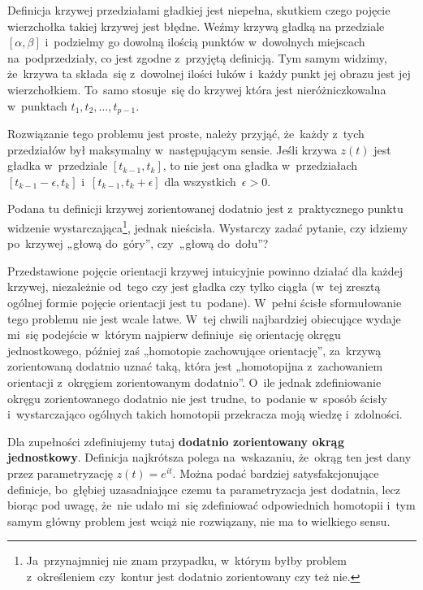 \documentclass[a4paper,11pt]{article}
\begin{document}
\vspace{\spaceFour}



\start {} Definicja krzywej przedziałami gładkiej jest
niepełna, skutkiem czego pojęcie wierzchołka takiej krzywej jest
błędne. Weźmy krzywą gładką na przedziale $[ \alpha, \beta ]$
i~podzielmy go dowolną ilością punktów w~dowolnych miejscach
na~podprzedziały, co jest zgodne z~przyjętą definicją. Tym samym
widzimy, że~krzywa ta składa~się z~dowolnej ilości łuków i~każdy punkt
jej obrazu jest jej wierzchołkiem. To~samo stosuje~się do krzywej
która jest nieróżniczkowalna w~punktach
$t_{ 1 }, t_{ 2 }, \ldots, t_{ p - 1 }$.

Rozwiązanie tego problemu jest proste, należy przyjąć, że~każdy z~tych
przedziałów był maksymalny w~następującym sensie. Jeśli krzywa
$z( t )$ jest gładka w~przedziale $[ t_{ k - 1 }, t_{ k } ]$, to nie
jest ona gładka w~przedziałach $[ t_{ k - 1 } - \epsilon, t_{ k } ]$
i~$[ t_{ k - 1 }, t_{ k } + \epsilon ]$ dla wszystkich~$\epsilon > 0$.

\vspace{\spaceFour}



\start {} Podana tu definicji krzywej zorientowanej dodatnio
jest z~praktycznego punktu widzenie
wystarczająca\footnote{Ja~przynajmniej nie znam przypadku, w~którym
  byłby problem z~określeniem czy~kontur jest dodatnio zorientowany
  czy też nie.}, jednak nieścisła. Wystarczy zadać pytanie, czy
idziemy po~krzywej „głową do~góry”, czy~„głową do~dołu”?

Przedstawione pojęcie orientacji krzywej intuicyjnie powinno działać
dla każdej krzywej, niezależnie od~tego czy jest gładka czy tylko
ciągła (w~tej zresztą ogólnej formie pojęcie orientacji jest
tu~podane). W~pełni ścisłe sformułowanie tego problemu nie jest wcale
łatwe. W~tej chwili najbardziej obiecujące wydaje mi~się podejście
w~którym najpierw definiuje~się orientację okręgu jednostkowego,
później zaś „homotopie zachowujące orientację”, za~krzywą
zorientowaną dodatnio uznać taką, która jest „homotopijna
z~zachowaniem orientacji z~okręgiem zorientowanym dodatnio”. O~ile
jednak zdefiniowanie okręgu zorientowanego dodatnio nie jest trudne,
to~podanie w~sposób ścisły i~wystarczająco ogólnych takich homotopii
przekracza moją wiedzę i~zdolności.

Dla zupełności zdefiniujemy tutaj \textbf{dodatnio zorientowany okrąg
  jednostkowy}. Definicja najkrótsza polega na~wskazaniu, że~okrąg ten
jest dany przez parametryzację $z( t ) = e^{ i t }$. Można podać
bardziej satysfakcjonujące definicje, bo~głębiej uzasadniające czemu
ta parametryzacja jest dodatnia, lecz biorąc pod uwagę, że~nie udało
mi~się zdefiniować odpowiednich homotopii i~tym samym główny problem
jest wciąż nie rozwiązany, nie ma to wielkiego sensu.
\end{document}
